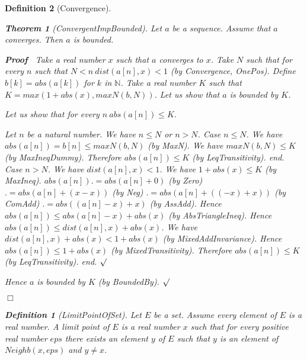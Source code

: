 \documentclass{article}
\newenvironment{forthel}{\begin{leftbar}}{\end{leftbar}}
\newenvironment{proof}{\noindent\textbf{Proof\ }}{\hspace*{\fill}$\Box$\medskip}
\newenvironment{subproof}{\begin{list}{}{}
		\item[\text{Proof}]}{\hfill $\surd$ \end{list}}
\newtheorem{theorem}{Theorem}
\newtheorem{definition}{Definition}
\newcommand{\NN}{\mathbb{N}}
\begin{document}
\begin{forthel}
\begin{definition}[Convergence]
	\begin{theorem}[ConvergentImpBounded]
	Let $a$ be a sequence. Assume that $a$ converges. Then $a$ is bounded.
	\end{theorem}
	\begin{proof}
	Take a real number $x$ such that $a$ converges to $x$.
	Take $N$ such that for every $n$ such that $N < n \ dist(a[n],x) < 1$ (by Convergence, OnePos).
	Define $b[k] = abs(a[k])$ for $k$ in $\NN$.
	Take a real number $K$ such that $K = max(1 + abs(x), maxN(b,N))$.
	Let us show that $a$ is bounded by $K$.
	\begin{subproof}
	Let us show that for every $n \ abs(a[n]) \leq K$.
	\begin{subproof} 
	Let $n$ be a natural number.
	We have $n \leq N$ or $n > N$.
	Case $n \leq N$.
	We have $abs(a[n]) = b[n] \leq maxN(b,N)$ (by MaxN).
	We have $maxN(b,N) \leq K$ (by MaxIneqDummy).
	Therefore $abs(a[n]) \leq K$ (by LeqTransitivity).
	end.
	Case $n > N$.
	We have $dist(a[n],x) < 1$.
	We have $1 + abs(x) \leq K$ (by MaxIneq).
	$abs(a[n]) .= abs(a[n] + 0)$ (by Zero)
	$.= abs(a[n] + (x - x))$ (by Neg)
	$.= abs(a[n] + ((-x) + x))$ (by ComAdd)
	$.= abs((a[n] - x) + x)$ (by AssAdd).
	Hence $abs(a[n]) \leq abs(a[n] - x) + abs(x)$ (by AbsTriangleIneq).
	Hence $abs(a[n]) \leq dist(a[n],x) + abs(x)$.
	We have $dist(a[n],x) + abs(x) < 1 + abs(x)$ (by MixedAddInvariance).
	Hence $abs(a[n]) \leq 1 + abs(x)$ (by MixedTransitivity).
	Therefore $abs(a[n]) \leq K$ (by LeqTransitivity).
	end.
	\end{subproof}
	Hence $a$ is bounded by $K$ (by BoundedBy).
	\end{subproof}
	\end{proof}
	
	\begin{definition}[LimitPointOfSet]
	Let $E$ be a set. Assume every element of $E$ is a real number. A limit point of $E$
	is a real number $x$ such that for every positive real number $eps$ there exists an element
	$y$ of $E$ such that $y$ is an element of $Neighb(x,eps)$ and $y \neq x$.
	\end{definition}
	

\end{definition}
\end{forthel}
\end{document}

